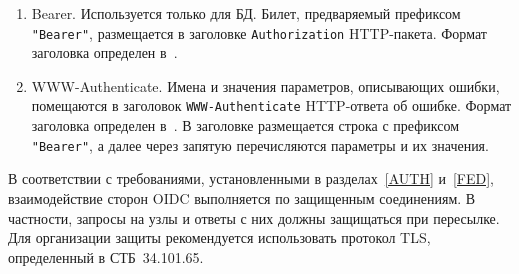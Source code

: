 \begin{enumerate}
\item
Bearer.
Используется только для БД.
%
Билет, предваряемый префиксом \lstinline{"Bearer"}, 
размещается в заголовке \lstinline{Authorization} HTTP-пакета.
%
Формат заголовка определен в~\cite{RFC6750}.

\item
WWW-Authenticate.
Имена и значения параметров, описывающих ошибки, помещаются в заголовок 
\lstinline{WWW-Authenticate} HTTP-ответа об ошибке. 
%
Формат заголовка определен в~\cite{RFC6750}.
%
В заголовке размещается строка с префиксом \lstinline{"Bearer"}, 
а далее через запятую перечисляются параметры и их значения.
\end{enumerate}

В соответствии с требованиями, установленными в разделах~\ref{AUTH} 
и~\ref{FED}, взаимодействие сторон OIDC выполняется по защищенным 
соединениям. В частности, запросы на узлы и ответы с них должны защищаться при 
пересылке. Для организации защиты рекомендуется использовать протокол TLS,
определенный в СТБ~34.101.65.
%
%

